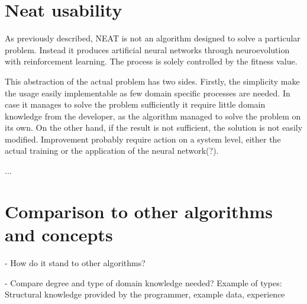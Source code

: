 \section{Neat usability}

As previously described, NEAT is not an algorithm designed to solve a particular problem. Instead it produces artificial neural networks through neuroevolution with reinforcement learning. The process is solely controlled by the fitness value.

This abstraction of the actual problem has two sides. Firstly, the simplicity make the usage easily implementable as few domain specific processes are needed. In case it manages to solve the problem sufficiently it require little domain knowledge from the developer, as the algorithm managed to solve the problem on its own. On the other hand, if the result is not sufficient, the solution is not easily modified. Improvement probably require action on a system level, either the actual training or the application of the neural network(?).

...

\section{Comparison to other algorithms and concepts}
- How do it stand to other algorithms?

- Compare degree and type of domain knowledge needed? Example of types: Structural knowledge provided by the programmer, example data, experience




